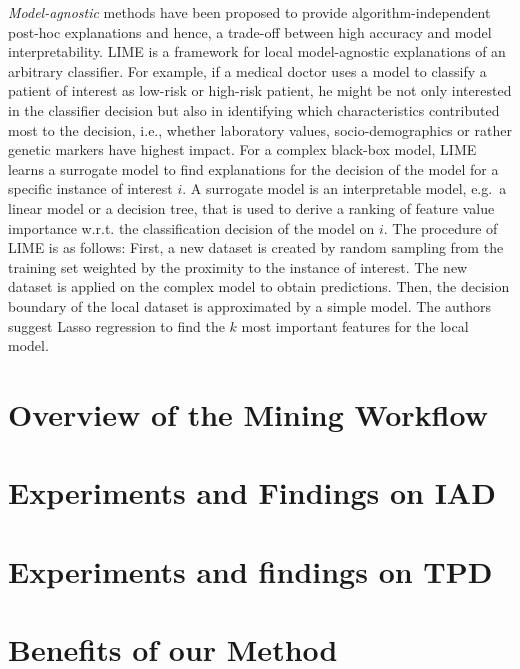 \documentclass[
]{book}
\begin{document}
\emph{Model-agnostic} methods have been proposed to provide algorithm-independent post-hoc explanations and hence, a trade-off between high accuracy and model interpretability.
LIME \autocite{RibeiroEtAl:KDD2016} is a framework for local model-agnostic explanations of an arbitrary classifier.
For example, if a medical doctor uses a model to classify a patient of interest as low-risk or high-risk patient, he might be not only interested in the classifier decision but also in identifying which characteristics contributed most to the decision, i.e., whether laboratory values, socio-demographics or rather genetic markers have highest impact.
For a complex black-box model, LIME learns a surrogate model to find explanations for the decision of the model for a specific instance of interest \(i\).
A surrogate model is an interpretable model, e.g.~a linear model or a decision tree, that is used to derive a ranking of feature value importance w.r.t. the classification decision of the model on \(i\).
The procedure of LIME is as follows:
First, a new dataset is created by random sampling from the training set weighted by the proximity to the instance of interest.
The new dataset is applied on the complex model to obtain predictions. Then, the decision boundary of the local dataset is approximated by a simple model.
The authors suggest Lasso regression to find the \(k\) most important features for the local model.

\hypertarget{overview-of-the-mining-workflow-2}{%
\section{Overview of the Mining Workflow}\label{overview-of-the-mining-workflow-2}}

\hypertarget{experiments-and-findings-on-iad}{%
\section{Experiments and Findings on IAD}\label{experiments-and-findings-on-iad}}

\hypertarget{experiments-and-findings-on-tpd}{%
\section{Experiments and findings on TPD}\label{experiments-and-findings-on-tpd}}

\hypertarget{benefits-of-our-method-3}{%
\section{Benefits of our Method}\label{benefits-of-our-method-3}}
\end{document}

